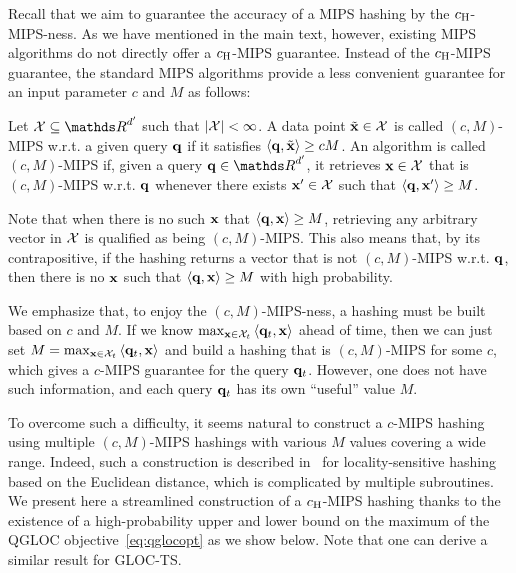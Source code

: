 Recall that we aim to guarantee the accuracy of a MIPS hashing by the $c_\text{\normalfont H}$-MIPS-ness.
As we have mentioned in the main text, however, existing MIPS algorithms do not directly offer a $c_\text{\normalfont H}$-MIPS guarantee.
Instead of the $c_\text{\normalfont H}$-MIPS guarantee, the standard MIPS algorithms provide a less convenient guarantee for an input parameter $c$ and $M$ as follows:
%
\begin{defn}
 Let $\cX \subseteq \dsR^{d'}$ such that $|\mathcal{X}| < \infty$.
 A data point $\tilde{\mathbf{x}} \in \mathcal{X}$ is called $(c,M)$-MIPS w.r.t. a given query ${{\mathbf q}}$ if it satisfies ${\langle} {{\mathbf q}}, \tilde{\mathbf{x}} {\rangle} \ge c M$.
 An algorithm is called $(c,M)$-MIPS if, given a query $\q\in {\dsR}^{d'}$, it retrieves $\mathbf{x} \in \mathcal{X}$ that is $(c,M)$-MIPS w.r.t. ${{\mathbf q}}$ whenever there exists $\mathbf{x}' \in \mathcal{X}$ such that ${\langle} {{\mathbf q}}, \mathbf{x}' {\rangle} \ge M$.
 \vspace{-4pt}
\end{defn}
%
Note that when there is no such $\mathbf{x}$ that ${\langle} {{\mathbf q}},\mathbf{x} {\rangle} \ge M$, retrieving any arbitrary vector in $\mathcal{X}$ is qualified as being $(c,M)$-MIPS.
This also means that, by its contrapositive, if the hashing returns a vector that is not $(c,M)$-MIPS w.r.t. ${{\mathbf q}}$, then there is no $\mathbf{x}$ such that ${\langle}{{\mathbf q}},\mathbf{x}{\rangle} \ge M$ with high probability.

We emphasize that, to enjoy the $(c,M)$-MIPS-ness, a hashing must be built based on $c$ and $M$.
If we know $\max_{\mathbf{x}\in\mathcal{X}_t} {\langle} {{\mathbf q}}_t, \mathbf{x} {\rangle}$ ahead of time, then we can just set $M = \max_{\mathbf{x}\in\mathcal{X}_t} {\langle} {{\mathbf q}}_t, \mathbf{x} {\rangle}$ and build a hashing that is $(c,M)$-MIPS for some $c$, which gives a $c$-MIPS guarantee for the query ${{\mathbf q}}_t$.
However, one does not have such information, and each query ${{\mathbf q}}_t$ has its own ``useful'' value $M$.

To overcome such a difficulty, it seems natural to construct a $c$-MIPS hashing using multiple $(c,M)$-MIPS hashings with various $M$ values covering a wide range.
Indeed, such a construction is described in~\cite{indyk12approximate} for locality-sensitive hashing based on the Euclidean distance, which is complicated by multiple subroutines.
We present here a streamlined construction of a $c_\text{\normalfont H}$-MIPS hashing thanks to the existence of a high-probability upper and lower bound on the maximum of the QGLOC objective~\eqref{eq:qglocopt} as we show below.
Note that one can derive a similar result for GLOC-TS.

